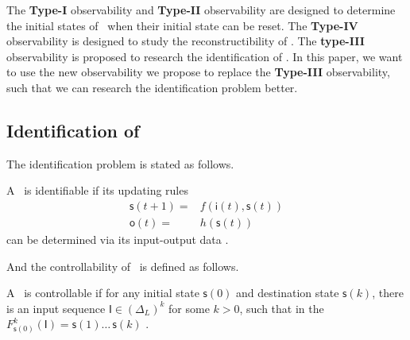  
The {\bf Type-I} observability and {\bf Type-II} observability are designed to determine the initial states of \BCNs\ when their initial state can be reset. The {\bf Type-IV} observability is designed to study the reconstructibility of \BCN. The {\bf type-III} observability is proposed to research the identification of \BCNs. In this paper, we want to use the new observability we propose to replace the {\bf Type-III} observability, such that we can research the identification problem better.


\subsection{Identification of \BCNs}
The identification problem is stated as follows. 
\begin{definition}[Identifiability]
	A \BCN\ is identifiable if its updating rules 
	\begin{equation*}
    		\begin{split}
		\mathsf{s}(t+1)=&f(\mathsf{i}(t),\mathsf{s}(t))\\
		\mathsf{o}(t)=&h(\mathsf{s}(t))
		\end{split}
	\end{equation*}
	can be determined via its input-output data \cite{Cheng2011Identification}.
\end{definition}

And the controllability of \BCNs\ is defined as follows.
\begin{definition}[Controllability]
	A \BCN\ is controllable if for any initial state $\mathsf{s}(0)$ and destination state $\mathsf{s}(k)$, there is an input sequence $\mathsf{I}\in(\Delta_L)^k$ for some $k>0$, such that in the $F^k_{\mathsf{s}(0)}(\mathsf{I})=\mathsf{s}(1) \ldots\, \mathsf{s}(k)$ \cite{cheng2009controllability}.
\end{definition}


